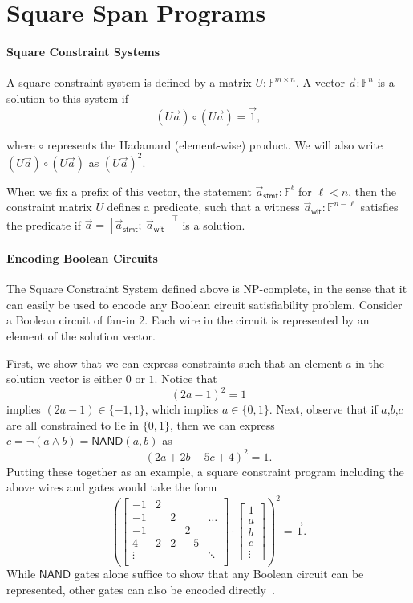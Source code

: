 \documentclass{article}
\theoremstyle{definition}
\theoremstyle{remark}
\newcommand{\F}{\mathbb{F}}
\begin{document}
\section{Square Span Programs}

\paragraph{Square Constraint Systems}
A square constraint system is defined by a matrix $U : \F^{m \times n}$. 
A vector $\vec{a} : \F^n$ is a solution to this system if
\begin{equation}
\label{eqn:ua2}
 \left( U \vec{a} \right)\circ\left( U \vec{a} \right) = \vec{1},
\end{equation}

where $\circ$ represents the Hadamard (element-wise) product. We will also write $(U\vec{a})\circ(U\vec{a})$ as $(U\vec{a})^2$.

When we fix a prefix of this vector, the statement $\vec{a}_\textsf{stmt} : \F^{\ell}$ for $\ell < n$, then the constraint matrix $U$ defines a predicate, such that a witness $\vec{a}_\textsf{wit} : \F^{n-\ell}$ satisfies the predicate if $\vec{a} = [\vec{a}_\textsf{stmt};~\vec{a}_\textsf{wit}]^\intercal$ is a solution.

\paragraph{Encoding Boolean Circuits}
The Square Constraint System defined above is NP-complete, in the sense that it can easily be used to encode any Boolean circuit satisfiability problem. Consider a Boolean circuit of fan-in 2. Each wire in the circuit is represented by an element of the solution vector.

First, we show that we can express constraints such that an element $a$ in the solution vector is either $0$ or $1$. Notice that
\[
(2a-1)^2 = 1
\]
implies $(2a-1) \in \{-1,1\}$, which implies $a \in \{0,1\}$. Next, observe that if $a$,$b$,$c$ are all constrained to lie in $\{0,1\}$, then we can express $c = \neg (a \land b) = \textsf{NAND}(a,b)$ as
 \[
    (2 a + 2 b -5c + 4)^2 = 1.
 \]
Putting these together as an example, a square constraint program including the above wires and gates would take the form
 \[
 \left(\begin{bmatrix} 
    -1 & 2 & & &  \\
    -1 &  & 2 & & \dots \\
    -1 &  & & 2 &  \\
     4 & 2 & 2 & -5 &  \\
    \vdots & & & & \ddots\\
    \end{bmatrix} \cdot
      \begin{bmatrix}
    1 \\ 
       a \\
       b \\
       c \\
       \vdots
       \end{bmatrix}\right)^2 = \vec{1}.
\]
While $\textsf{NAND}$ gates alone suffice to show that any Boolean circuit can be represented, other gates can also be encoded directly~\cite{squarespan}.
\end{document}
